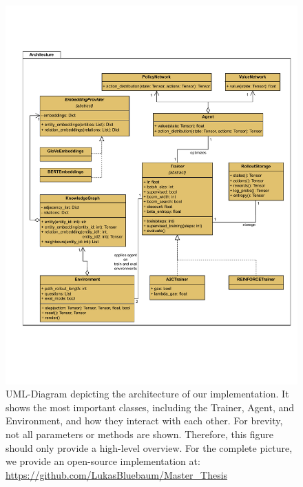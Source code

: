 \begin{figure}[htbp]
	\centering
	\includegraphics[clip, trim=0cm 4cm 0cm 2cm, width=1.15\textwidth]{figures/implementation}
	\caption{UML-Diagram depicting the architecture of our implementation. It shows the most important 
	classes, including the Trainer, Agent, and Environment, and how they interact with each other. For brevity, not 
	all parameters or methods are shown. Therefore, this figure should only provide a high-level overview. For the complete picture, 
	we provide an open-source implementation at: \\ \url{https://github.com/LukasBluebaum/Master_Thesis}}
	\label{fig:implementation}
  \end{figure}